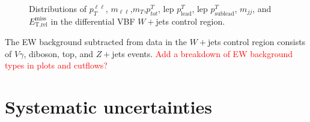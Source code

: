 \begin{figure}[!h]
{  }\hfill
  \hfill
  \hfill
{\caption{Distributions of $p_T^{\ell\ell}$, $m_{\ell\ell}$,$m_T$,$p^T_{tot}$, lep $p^T_{\text{lead}}$, lep $p^T_{\text{sublead}}$, $m_{jj}$, and $\ensuremath{E_{\text{T,rel}}^{\text{miss}}}$ in the differential VBF $W+$jets control region.
\label{fig:WCR}}}
\end{figure}  

The EW background subtracted from data in the $W+$jets control region consists of $V\gamma$, diboson, top, and $Z+$jets events. \textcolor{red}{Add a breakdown of EW background types in plots and cutflows?}

\section{Systematic uncertainties}

